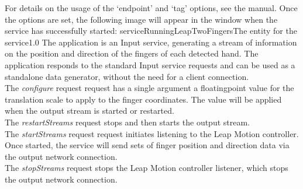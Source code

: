 For details on the usage of the `endpoint' and `tag' options, see the \emph{\CMU} manual.
Once the options are set, the following image will appear in the \emph{\CMU} window when
the service has successfully started:
%
{serviceRunningLeapTwoFingers}{The \emph{\CMU} entity for the \emph{\LTFI} service}{1.0}
\secondaryEnd
\primaryEnd{}
The  application is an Input service,
generating a stream of information on the position and direction of the fingers of each
detected hand.
The application responds to the standard Input service requests and can be used as a
standalone data generator, without the need for a client connection.\\

The \emph{configure} request request has a single argument \longDash{} a
floating\longDash{}point value for the translation scale to apply to the finger
coordinates.
The value will be applied when the output stream is started or restarted.\\ 

The \emph{restartStreams} request stops and then starts the output stream.\\

The \emph{startStreams} request request initiates listening to the Leap Motion controller.
Once started, the service will send sets of finger position and direction data via the
output \yarp{} network connection.\\

The \emph{stopStreams} request stops the Leap Motion controller listener, which stops the
output \yarp{} network connection.\\ 

